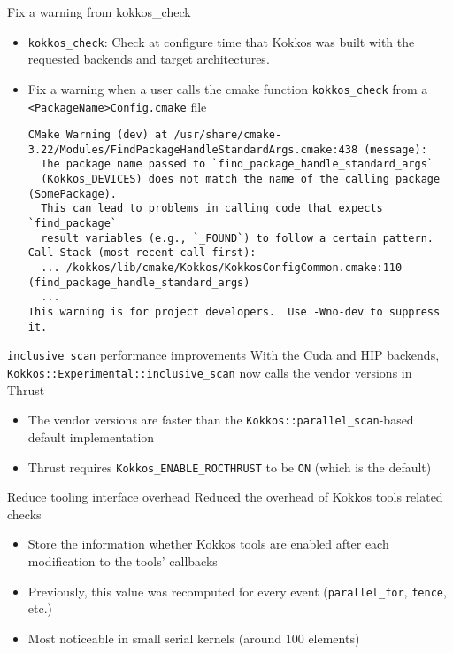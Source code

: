 \begin{frame}[fragile]{Fix a warning from kokkos\_check}
 \begin{itemize}
    \item \texttt{kokkos\_check}: Check at configure time that Kokkos was built with the requested backends and target architectures.
    \item Fix a warning when a user calls the cmake function \texttt{kokkos\_check} from a \texttt{<PackageName>Config.cmake} file
    {\tiny \begin{verbatim}
CMake Warning (dev) at /usr/share/cmake-3.22/Modules/FindPackageHandleStandardArgs.cmake:438 (message):
  The package name passed to `find_package_handle_standard_args`
  (Kokkos_DEVICES) does not match the name of the calling package (SomePackage).
  This can lead to problems in calling code that expects `find_package`
  result variables (e.g., `_FOUND`) to follow a certain pattern.
Call Stack (most recent call first):
  ... /kokkos/lib/cmake/Kokkos/KokkosConfigCommon.cmake:110 (find_package_handle_standard_args)
  ...
This warning is for project developers.  Use -Wno-dev to suppress it.
    \end{verbatim}}
 \end{itemize}
\end{frame}

\begin{frame}[fragile]{\texttt{inclusive\_scan} performance improvements}
  With the Cuda and HIP backends, \texttt{Kokkos::Experimental::inclusive\_scan} now calls the vendor versions in Thrust
  \begin{itemize}
     \item The vendor versions are faster than the \texttt{Kokkos::parallel\_scan}-based default implementation
     \item Thrust requires \texttt{Kokkos\_ENABLE\_ROCTHRUST} to be \texttt{ON} (which is the default)
  \end{itemize}
\end{frame}

\begin{frame}[fragile]{Reduce tooling interface overhead}
  Reduced the overhead of Kokkos tools related checks
  \begin{itemize}
      \item Store the information whether Kokkos tools are enabled after each modification to the tools' callbacks
      \item Previously, this value was recomputed for every event (\texttt{parallel\_for}, \texttt{fence}, etc.)
      \item Most noticeable in small serial kernels (around 100 elements)
  \end{itemize}
\end{frame}

